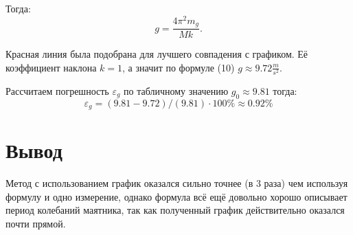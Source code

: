 \documentclass[12pt, a4paper]{article}
\begin{document}
Тогда:
\begin{equation}
    g = \frac{4\pi^2m_g}{Mk}.
\end{equation}

Красная линия была подобрана для лучшего совпадения с графиком. Её коэффициент
наклона $k = 1$, а значит по формуле (10) $g \approx 9.72 \frac{m}{s^2}$.

Рассчитаем погрешность $\varepsilon_g$ по табличному значению
$g_0 \approx 9.81$
тогда:
\[\varepsilon_g = (9.81 - 9.72) / (9.81) \cdot 100 \% \approx 0.92\%\]

\section{Вывод}

Метод с использованием график оказался сильно точнее (в 3 раза) чем
используя формулу и одно измерение, однако формула всё ещё довольно
хорошо описывает период колебаний маятника, так как полученный график
действительно оказался почти прямой.
\end{document}
